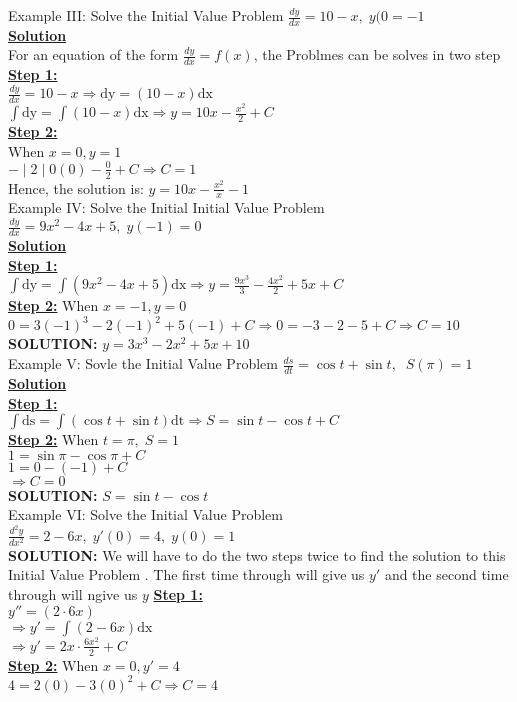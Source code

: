 \documentclass[a4paper 11pt]{article}
\newcommand{\bt}[1]{\textbf{#1}}
\newcommand{\NI}{\noindent}
\newcommand{\IVP}{Initial Value Problem }
\newcommand{\dsp}{\displaystyle}
\newcommand{\be}{\(\dsp} %
\newcommand{\ee}{\)\\[0.3cm]} %
\newcommand{\sol}{\bt{\NI\underline{Solution}}\\[0.2cm]}
\newcommand{\st}{\bt{\underline{Step 1:}}\\[0.2cm]}
\newcommand{\sprime}{'}
\newcommand{\dprime}{''}
\newcommand{\stn}[1]{\bt{\underline{Step 2:}} When \be#1\ee}
\newcommand{\imp}{\Rightarrow}
\begin{document}
\NI Example III: Solve the \IVP \(\displaystyle \frac{dy}{dx} = 10 - x, \; y(0 = -1\)\\[0.4cm]
\bt{\underline{Solution}}\\[0.2cm]
For an equation of the form \(\displaystyle \frac{dy}{dx} = f(x)\), the Problmes can be solves in two step\\[0.3cm]
\bt{\underline{Step 1:}}\\[0.2cm]
\(\displaystyle \frac{dy}{dx} = 10 - x \Rightarrow \text{dy} = (10 - x)\text{dx}\)\\[0.3cm]
\(\displaystyle \int \text{dy} = \int (10 - x)\text{dx} \Rightarrow y = 10x - \frac{x^2}{2} + C\)\\[0.3cm]
\bt{\underline{Step 2:}}\\[0.2cm]
When \( \displaystyle x=0, y= 1\)\\[0.3cm]
\(\displaystyle-\mid 2 \mid 0(0) - \frac{0}{2} + C \Rightarrow C=1\)\\[0.2cm]
Hence, the solution  is: \(\displaystyle y = 10x - \frac{x^2}{x} - 1\)\\[0.2cm]
Example IV: Solve the Initial \IVP \(\dsp \frac{dy}{dx} = 9x^2 - 4x + 5, \; y(-1) = 0\)\\[0.4cm]
\bt{\underline{Solution}}\\[0.2cm]
\bt{\underline{Step 1:}}\\[0.2cm]
\(\dsp\int \text{dy} = \int (9x^2 - 4x + 5)\text{dx} \Rightarrow y = \frac{9x^3}{3} - \frac{4x^2}{2} + 5x + C\)\\[0.3cm]
\bt{\underline{Step 2:}} When \(x = -1, y=0\)\\[0.2cm]
\be 0=3(-1)^3 - 2(-1)^2 + 5(-1) + C \Rightarrow 0 = -3 - 2 - 5 + C \Rightarrow C = 10\ee
\bt{SOLUTION:} \be y = 3x^3 - 2x^2 + 5x + 10 \ee
Example V: Sovle the \IVP \be \frac{ds}{dt} = \cos t + \sin t ,\; \; S(\pi) = 1 \ee
\sol \st
\be \int\text{ds} = \int(\cos t + \sin t)\text{dt} \imp S = \sin t - \cos t + C \ee
\stn{ t = \pi, \; S= 1}
\be 1 = \sin \pi - \cos \pi + C\ee
\be 1 = 0 - (-1) + C \ee
\be \imp C = 0 \ee
\bt{SOLUTION:} \be S = \sin t - \cos t \ee
Example VI: Solve the \IVP \be \frac{d^{2}y}{dx^2} = 2 - 6x, \; y\sprime(0) = 4, \; y(0) = 1 \ee
\bt{SOLUTION:} We will have to do the two steps twice to find the solution to this \IVP. The first time through will give us \(y\sprime\) and the second time through will ngive us \(y\)
\newpage
\NI \st
\be y\dprime =(2 \cdot 6x) \ee
\be \imp y\sprime = \int (2 - 6x)\text{dx} \ee
\be \imp y\sprime = 2x \cdot \frac{6x^2}{2} + C \ee
\stn{x=0, y\sprime = 4}
\be 4 = 2(0) - 3(0)^2 + C \imp C = 4\ee
\end{document}
